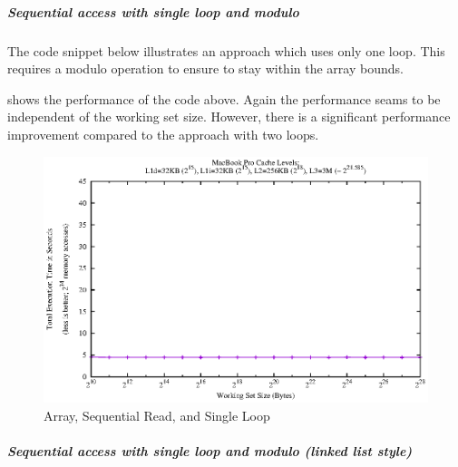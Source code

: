 \hypertarget{sequential-access-with-single-loop-and-modulo}{\subparagraph{Sequential
access with single loop and
modulo}\label{sequential-access-with-single-loop-and-modulo}}

The code snippet below illustrates an approach which uses only one loop.
This requires a modulo operation to ensure to stay within the array
bounds.

\begin{Shaded}
\end{Shaded}

 shows the performance of the code above. Again the
performance seams to be independent of the working set size. However,
there is a significant performance improvement compared to the approach
with two loops.

\begin{figure}[htbp]
\centering
\includegraphics{appendix/plots-cache-measurements/plot-array-modulo-seq}
\caption{Array, Sequential Read, and Single Loop}
\label{app:arr-seqread-sl}
\end{figure}

\hypertarget{sequential-access-with-single-loop-and-modulo-linked-list-style}{\subparagraph{Sequential
access with single loop and modulo (linked list
style)}\label{sequential-access-with-single-loop-and-modulo-linked-list-style}}

